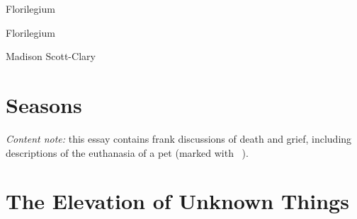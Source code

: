 \documentclass[10pt,oneside]{memoir}
\begin{document}
  \frontmatter

  \thispagestyle{empty}
  \null
  \vfill
  \begin{flushright}
    \DisplayFont Florilegium
  \end{flushright}
  \vfill
  \cleardoublepage

  \pagestyle{plain}


  \begin{flushright}
    \null
    \vfill
    {\Huge\DisplayFont Florilegium}

    \vfill

    {\Large\DisplayFont Madison Scott-Clary}
  \end{flushright}
  \thispagestyle{empty}

  \newpage


  \tableofcontents*
  \newpage
  \null
  \cleardoublepage

  \onehalfspacing


  \mainmatter

  \pagestyle{ourbook}

  \chapter{Seasons}

\begin{center}
  \footnotesize \emph{Content note:} this essay contains frank discussions of death and grief, including descriptions of the euthanasia of a pet (marked with \Warn~).\normalsize
\end{center}

\vskip1cm

  
  
  
  
  
  
  

  \chapter{The Elevation of Unknown Things}
  \setcounter{footnote}{0}
  
  
  
  
  
\end{document}
